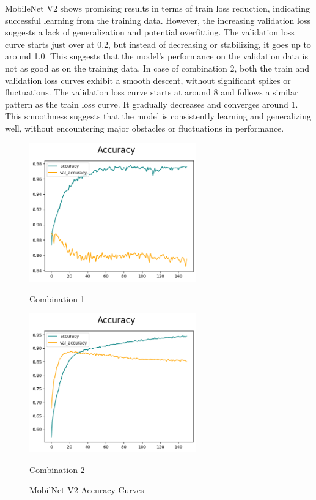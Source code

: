 MobileNet V2 shows promising results in terms of train loss reduction, indicating successful learning from the training data. However, the increasing validation loss suggests a lack of generalization and potential overfitting. The validation loss curve starts just over at 0.2, but instead of decreasing or stabilizing, it goes up to around 1.0. This suggests that the model's performance on the validation data is not as good as on the training data. In case of combination 2, both the train and validation loss curves exhibit a smooth descent, without significant spikes or fluctuations. The validation loss curve starts at around 8 and follows a similar pattern as the train loss curve. It gradually decreases and converges around 1. This smoothness suggests that the model is consistently learning and generalizing well, without encountering major obstacles or fluctuations in performance.

\begin{figure}[H]
    \centering
    \begin{minipage}[b]{0.49\textwidth}
        \centering
        \includegraphics[width=\textwidth, height=6cm]{Figures/unbalanced_data/without bn/mn2/accuracy.png}
        \captionsetup{labelformat=empty}
        \caption{Combination 1}
        \label{fig:u_wo_r_a}
    \end{minipage}
    \hfill
    \begin{minipage}[b]{0.49\textwidth}
        \centering
        \includegraphics[width=\textwidth, height=6cm]{Figures/unbalanced_data/with bn/mn2/accuracy.png}
        \captionsetup{labelformat=empty}
        \caption{Combination 2}
        \label{fig:u_w_r_a}
    \end{minipage}
    \captionsetup{labelformat=default}
    \caption{MobilNet V2 Accuracy Curves}
\end{figure}


